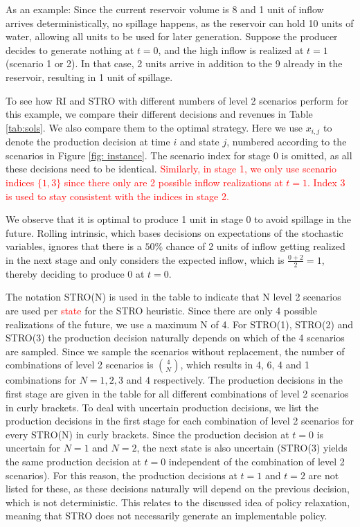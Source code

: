 As an example: Since the current reservoir volume is 8 and 1 unit of inflow arrives deterministically, no spillage happens, as the reservoir can hold 10 units of water, allowing all units to be used for later generation. Suppose the producer decides to generate nothing at $t=0$, and the high inflow is realized at $t=1$ (scenario 1 or 2). In that case, 2 units arrive in addition to the 9 already in the reservoir, resulting in 1 unit of spillage.   

To see how RI and STRO with different numbers of level 2 scenarios perform for this example, we compare their different decisions and revenues in Table \ref{tab:sols}. We also compare them to the optimal strategy. Here we use $x_{i,j}$ to denote the production decision at time $i$ and state $j$, numbered according to the scenarios in Figure \ref{fig: instance}. The scenario index for stage 0 is omitted, as all these decisions need to be identical. \textcolor{red}{Similarly, in stage 1, we only use scenario indices $\{1,3\}$ since there only are 2 possible inflow realizations at $t=1$. Index 3 is used to stay consistent with the indices in stage 2.}

We observe that it is optimal to produce 1 unit in stage 0 to avoid spillage in the future. Rolling intrinsic, which bases decisions on expectations of the stochastic variables, ignores that there is a $50\%$ chance of 2 units of inflow getting realized in the next stage and only considers the expected inflow, which is $\frac{0+2}{2}=1$, thereby deciding to produce 0 at $t=0$. 

The notation STRO(N) is used in the table to indicate that N level 2 scenarios are used per \textcolor{red}{state}  for the STRO heuristic. Since there are only 4 possible realizations of the future, we use a maximum N of 4. 
For STRO(1), STRO(2) and STRO(3) the production decision naturally depends on which of the 4 scenarios are sampled. Since we sample the scenarios without replacement, the number of combinations of level 2 scenarios is ${4 \choose N}$, which results in 4, 6, 4 and 1 combinations for $N=1, 2, 3$ and $4$ respectively. The production decisions in the first stage are given in the table for all different combinations of level 2 scenarios in curly brackets. To deal with uncertain production decisions, we list the production decisions in the first stage for each combination of level 2 scenarios for every STRO(N) in curly brackets. Since the production decision at $t=0$ is uncertain for $N=1$ and $N=2$, the next state is also uncertain (STRO(3) yields the same production decision at $t=0$ independent of the combination of level 2 scenarios). For this reason, the production decisions at $t=1$ and $t=2$ are not listed for these, as these decisions naturally will depend on the previous decision, which is not deterministic. This relates to the discussed idea of policy relaxation, meaning that STRO does not necessarily generate an implementable policy.




